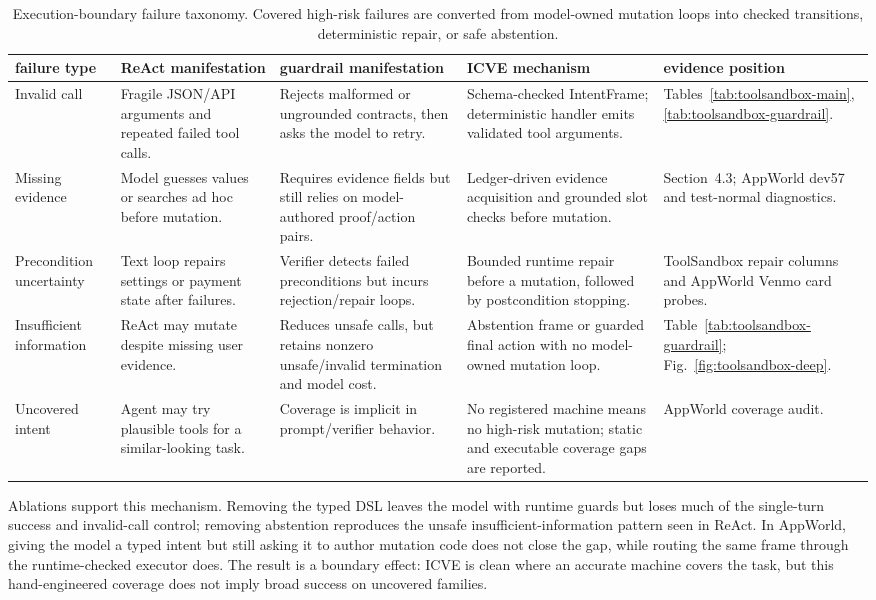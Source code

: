 \documentclass[11pt]{article}
\begin{document}
\begin{table}[t]
\centering
\scriptsize
\setlength{\tabcolsep}{3pt}
\begin{tabular}{p{}p{}p{}p{}p{}}
\toprule
failure type & ReAct manifestation & guardrail manifestation & ICVE mechanism & evidence position \\
\midrule
Invalid call & Fragile JSON/API arguments and repeated failed tool calls. & Rejects
malformed or ungrounded contracts, then asks the model to retry. & Schema-checked
IntentFrame; deterministic handler emits validated tool arguments. &
Tables~\ref{tab:toolsandbox-main}, \ref{tab:toolsandbox-guardrail}. \\
Missing evidence & Model guesses values or searches ad hoc before mutation. & Requires
evidence fields but still relies on model-authored proof/action pairs. & Ledger-driven
evidence acquisition and grounded slot checks before mutation. &
Section~4.3; AppWorld dev57 and test-normal diagnostics. \\
Precondition uncertainty & Text loop repairs settings or payment state after failures. &
Verifier detects failed preconditions but incurs rejection/repair loops. & Bounded
runtime repair before a mutation, followed by postcondition stopping. &
ToolSandbox repair columns and AppWorld Venmo card probes. \\
Insufficient information & ReAct may mutate despite missing user evidence. & Reduces
unsafe calls, but retains nonzero unsafe/invalid termination and model cost. & Abstention
frame or guarded final action with no model-owned mutation loop. &
Table~\ref{tab:toolsandbox-guardrail}; Fig.~\ref{fig:toolsandbox-deep}. \\
Uncovered intent & Agent may try plausible tools for a similar-looking task. & Coverage
is implicit in prompt/verifier behavior. & No registered machine means no high-risk
mutation; static and executable coverage gaps are reported. & AppWorld coverage audit. \\
\bottomrule
\end{tabular}
\caption{Execution-boundary failure taxonomy. Covered high-risk failures are converted
from model-owned mutation loops into checked transitions, deterministic repair, or safe
abstention.}
\label{tab:failure-taxonomy}
\end{table}

Ablations support this mechanism. Removing the typed DSL leaves the model with runtime
guards but loses much of the single-turn success and invalid-call control; removing
abstention reproduces the unsafe insufficient-information pattern seen in ReAct. In
AppWorld, giving the model a typed intent but still asking it to author mutation code
does not close the gap, while routing the same frame through the runtime-checked executor
does. The result is a boundary effect: ICVE is clean where an accurate machine covers the
task, but this hand-engineered coverage does not imply broad success on uncovered
families.
\end{document}
